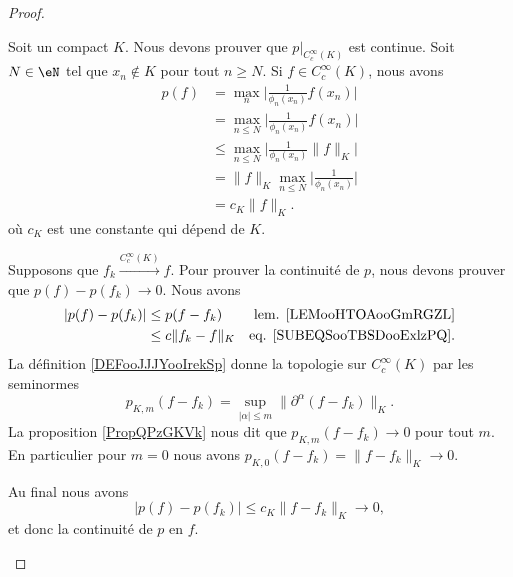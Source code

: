 \begin{proof}
\begin{subproof}
		Soit un compact \( K\). Nous devons prouver que \( p|_{C^{\infty}_c(K)}\) est continue. Soit \( N\in \eN\) tel que \( x_n\not\in K\) pour tout \( n\geq N\). Si \( f\in C^{\infty}_c(K)\), nous avons
		\begin{subequations}	\label{SUBEQSooTBSDooExlzPQ}
			\begin{align}
				p(f) & =\max_n\big| \frac{1}{ \phi_n(x_n)}f(x_n) \big|                \\
				     & =\max_{n\leq N}\big| \frac{1}{ \phi_n(x_n)}f(x_n) \big|        \\
				     & \leq \max_{n\leq N}\big| \frac{1}{ \phi_n(x_n)}\| f \|_K \big| \\
				     & =\| f \|_K\max_{n\leq N}\big| \frac{1}{ \phi_n(x_n)} \big|     \\
				     & = c_K\| f \|_K.
			\end{align}
		\end{subequations}
		où \( c_K\) est une constante qui dépend de \( K\).

		Supposons que \( f_k\stackrel{ C^{\infty}_c(K)}{\longrightarrow} f\). Pour prouver la continuité de \( p\), nous devons prouver que \( p(f)-p(f_k)\to 0\). Nous avons
		\begin{subequations}
			\begin{align}
				| p(f)-p(f_k) | & \leq p(f-f_k)       & \text{lem. \ref{LEMooHTOAooGmRGZL}}      \\
				                & \leq c\| f_k-f \|_K & \text{eq. \eqref{SUBEQSooTBSDooExlzPQ}}.
			\end{align}
		\end{subequations}
		La définition \ref{DEFooJJJYooIrekSp} donne la topologie sur \( C^{\infty}_c(K)\) par les seminormes
		\begin{equation}
			p_{K,m}(f-f_k)=\sup_{| \alpha |\leq m}\| \partial^{\alpha}(f-f_k) \|_K.
		\end{equation}
		La proposition \ref{PropQPzGKVk} nous dit que \( p_{K,m}(f-f_k)\to 0\) pour tout \( m\). En particulier pour \( m=0\) nous avons \( p_{K,0}(f-f_k)=\| f-f_k \|_K\to 0\).

		Au final nous avons
		\begin{equation}
			| p(f)-p(f_k) |\leq c_K\| f-f_k \|_K\to 0,
		\end{equation}
		et donc la continuité de \( p\) en \( f\).

		\spitem[La contradiction]


\end{subproof}
\end{proof}
